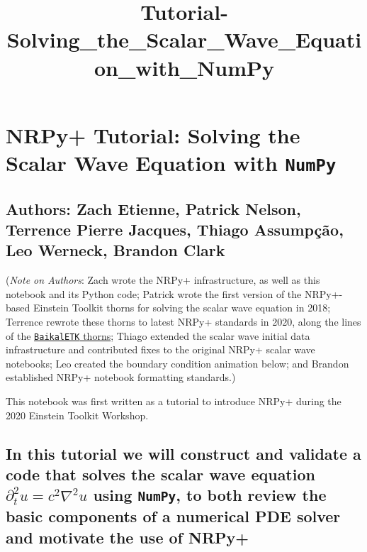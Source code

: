 \documentclass[landscape,letterpaper,10pt,english]{article}
\title{Tutorial-Solving\_the\_Scalar\_Wave\_Equation\_with\_NumPy}
\begin{document}
    
    \maketitle
    
    

    
    \hypertarget{nrpy-tutorial-solving-the-scalar-wave-equation-with-numpy}{%
\section{\texorpdfstring{NRPy+ Tutorial: Solving the Scalar Wave
Equation with
\texttt{NumPy}}{NRPy+ Tutorial: Solving the Scalar Wave Equation with NumPy}}\label{nrpy-tutorial-solving-the-scalar-wave-equation-with-numpy}}

\hypertarget{authors-zach-etienne-patrick-nelson-terrence-pierre-jacques-thiago-assumpuxe7uxe3o-leo-werneck-brandon-clark}{%
\subsection{Authors: Zach Etienne, Patrick Nelson, Terrence Pierre
Jacques, Thiago Assumpção, Leo Werneck, Brandon
Clark}\label{authors-zach-etienne-patrick-nelson-terrence-pierre-jacques-thiago-assumpuxe7uxe3o-leo-werneck-brandon-clark}}

(\emph{Note on Authors}: Zach wrote the NRPy+ infrastructure, as well as
this notebook and its Python code; Patrick wrote the first version of
the NRPy+-based Einstein Toolkit thorns for solving the scalar wave
equation in 2018; Terrence rewrote these thorns to latest NRPy+
standards in 2020, along the lines of the
\href{Tutorial-BaikalETK.ipynb}{\texttt{BaikalETK} thorns}; Thiago
extended the scalar wave initial data infrastructure and contributed
fixes to the original NRPy+ scalar wave notebooks; Leo created the
boundary condition animation below; and Brandon established NRPy+
notebook formatting standards.)

This notebook was first written as a tutorial to introduce NRPy+ during
the 2020 Einstein Toolkit Workshop.

\hypertarget{in-this-tutorial-we-will-construct-and-validate-a-code-that-solves-the-scalar-wave-equation-partial_t2-u-c2-nabla2-u-using-numpy-to-both-review-the-basic-components-of-a-numerical-pde-solver-and-motivate-the-use-of-nrpy}{%
\subsection{\texorpdfstring{In this tutorial we will construct and
validate a code that solves the scalar wave equation
\(\partial_t^2 u = c^2 \nabla^2 u\) using \texttt{NumPy}, to both review
the basic components of a numerical PDE solver and motivate the use of
NRPy+}{In this tutorial we will construct and validate a code that solves the scalar wave equation \textbackslash partial\_t\^{}2 u = c\^{}2 \textbackslash nabla\^{}2 u using NumPy, to both review the basic components of a numerical PDE solver and motivate the use of NRPy+}}\label{in-this-tutorial-we-will-construct-and-validate-a-code-that-solves-the-scalar-wave-equation-partial_t2-u-c2-nabla2-u-using-numpy-to-both-review-the-basic-components-of-a-numerical-pde-solver-and-motivate-the-use-of-nrpy}}
\end{document}
